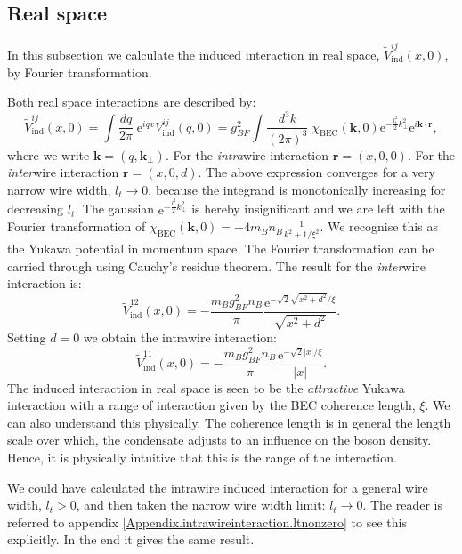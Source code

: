 \subsection{Real space}
\label{subsec.inducedinteraction.realspace}
In this subsection we calculate the induced interaction in real space, $\tilde{V}^{ij}_{\text{ind}}(x, 0)$, by Fourier transformation. 

Both real space interactions are described by: 
\begin{equation}
\tilde{V}^{ij}_{\text{ind}}(x, 0) = \int \frac{dq}{2\pi} \; \text{e}^{iqx} V^{ij}_{\text{ind}}(q, 0) = g^2_{BF}\int \frac{d^3 k}{(2\pi)^3}\;\chi_\text{BEC}(\mathbf{k}, 0)\text{e}^{-\frac{l_t^2}{2}k_\perp^2}\text{e}^{i\mathbf{k}\cdot \mathbf{r}}, \nonumber
\end{equation}
where we write $\mathbf{k} = (q, \mathbf{k}_{\perp})$. For the \textit{intra}wire interaction $\mathbf{r} = (x, 0, 0)$. For the \textit{inter}wire interaction $\mathbf{r} = (x, 0, d)$. The above expression converges for a very narrow wire width, $l_t \to 0$, because the integrand is monotonically increasing for decreasing $l_t$. The gaussian $\text{e}^{-\frac{l_t^2}{2}k_\perp^2}$ is hereby insignificant and we are left with the Fourier transformation of $\chi_\text{BEC}(\mathbf{k}, 0) = -4m_Bn_B\frac{1}{k^2 + 1/\xi^2}$. We recognise this as the Yukawa potential in momentum space. The Fourier transformation can be carried through using Cauchy's residue theorem. The result for the \textit{inter}wire interaction is:
\begin{equation}
\tilde{V}^{12}_{\text{ind}}(x, 0) = -\frac{m_Bg_{BF}^2n_B}{\pi}\frac{\text{e}^{ -\sqrt{2}\sqrt{x^2 + d^2}/\xi }}{\sqrt{x^2 + d^2}}.
\label{eq.V12indx}
\end{equation}
Setting $d = 0$ we obtain the intrawire interaction:
\begin{equation}
\tilde{V}^{11}_{\text{ind}}(x, 0) = -\frac{m_Bg_{BF}^2n_B}{\pi}\frac{\text{e}^{ -\sqrt{2}|x|/\xi }}{|x|}.
\label{eq.V11indx}
\end{equation}
The induced interaction in real space is seen to be the \textit{attractive} Yukawa interaction with a range of interaction given by the BEC coherence length, $\xi$. We can also understand this physically. The coherence length is in general the length scale over which, the condensate adjusts to an influence on the boson density. Hence, it is physically intuitive that this is the range of the interaction.  

We could have calculated the intrawire induced interaction for a general wire width, $l_t > 0$, and then taken the narrow wire width limit: $l_t \to 0$. The reader is referred to appendix \ref{Appendix.intrawireinteraction.ltnonzero} to see this explicitly. In the end it gives the same result. 

